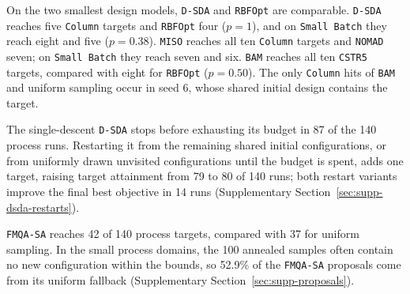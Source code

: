 \documentclass{article}
\begin{document}
On the two smallest design models, \texttt{D-SDA} and \texttt{RBFOpt} are comparable.
\texttt{D-SDA} reaches five \texttt{Column} targets and \texttt{RBFOpt} four (\(p=1\)), and on \texttt{Small Batch} they reach eight and five (\(p=0.38\)).
\texttt{MISO} reaches all ten \texttt{Column} targets and \texttt{NOMAD} seven; on \texttt{Small Batch} they reach seven and six.
\texttt{BAM} reaches all ten \texttt{CSTR5} targets, compared with eight for \texttt{RBFOpt} (\(p=0.50\)).
The only \texttt{Column} hits of \texttt{BAM} and uniform sampling occur in seed 6, whose shared initial design contains the target.

The single-descent \texttt{D-SDA} stops before exhausting its budget in 87 of the 140 process runs.
Restarting it from the remaining shared initial configurations, or from uniformly drawn unvisited configurations until the budget is spent, adds one target, raising target attainment from 79 to 80 of 140 runs; both restart variants improve the final best objective in 14 runs (Supplementary Section~\ref{sec:supp-dsda-restarts}).

\texttt{FMQA-SA} reaches 42 of 140 process targets, compared with 37 for uniform sampling.
In the small process domains, the 100 annealed samples often contain no new configuration within the bounds, so 52.9\% of the \texttt{FMQA-SA} proposals come from its uniform fallback (Supplementary Section~\ref{sec:supp-proposals}).
\end{document}
